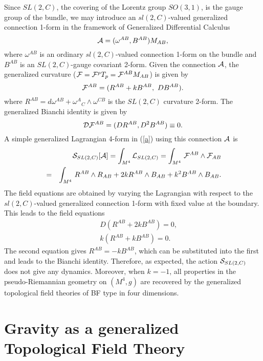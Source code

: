 \documentclass[a4paper,twocolumn,showpacs,prd]{revtex4}
\begin{document}
Since $SL(2,C)$, the covering of the Lorentz group $SO(3,1)$, is
the  gauge group of the bundle, we may introduce an
$sl(2,C)$-valued generalized connection 1-form in the framework of
Generalized Differential Calculus
\begin{equation}
{\cal A}=(\omega^{AB}, B^{AB} ) M_{AB} , \label{71}
\end{equation}
where $\omega^{AB}$ is an ordinary $sl(2,C)$-valued connection
1-form on the bundle and $B^{AB}$ is an $SL(2,C)$-gauge covariant
2-form. Given the connection ${\cal A}$, the generalized curvature
(${\cal F}={\cal F}^p T_p={\cal F}^{AB} M_{AB}$) is given by
\begin{equation}
{\cal F}^{AB}=(R^{AB}+ k B^{AB},~ D B^{AB}) .
\end{equation}
where $R^{AB}=d \omega^{AB}+ \omega^A{}_C\wedge \omega^{CB}$ is
the $SL(2,C)$ curvature 2-form. The generalized Bianchi identity
is given by
\begin{equation}
 {\cal D} {\cal F}^{AB} =
( DR^{AB}, D^2 B^{AB})\equiv 0 . \label{Bianchi-SL2C}
\end{equation}
A simple generalized Lagrangian  4-form in (\ref{a}) using this
connection $\cal A$ is
\begin{eqnarray}
&&{\cal S}_{{SL(2,C)}}[{\cal A}]=\int_{M^4} {\cal L}_{{SL(2,C)}}
=\int_{M^4} \, {\cal F}^{AB}\wedge {\cal F}_{AB} \nonumber\\
&=& \int_{M^4} \, R^{AB} \wedge R_{AB} + 2k R^{AB}\wedge
B_{AB}+k^2 B^{AB} \wedge B_{AB} . \nonumber\\
\label{SL2C-action}
\end{eqnarray}
The field equations are obtained by varying the Lagrangian with
respect to the $sl(2,C)$-valued generalized connection 1-form with
fixed value at the boundary. This leads to the field equations
\begin{eqnarray}
&& D(R^{AB} + 2 k B^{AB}) =0,\label{81} \\
&& k (R^{AB}+ k B^{AB})=0.\label{82}
\end{eqnarray}
The second equation gives  $R^{AB}=-k B^{AB}$, which can be
substituted into the first and leads to the Bianchi identity.
Therefore, as expected, the action ${\cal S}_{{SL(2,C)}}$ does not
give any dynamics. Moreover, when $k=-1$, all properties in the
pseudo-Riemannian geometry on $(M^4, g)$ are recovered by the
generalized topological field theories of BF type in four
dimensions.

\section{Gravity as a generalized Topological Field Theory}
\end{document}
